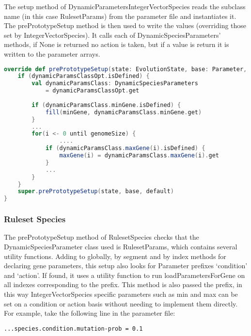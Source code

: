 The setup method of DynamicParametersIntegerVectorSpecies reads the subclass name (in this case RulesetParams) from the parameter file and instantiates it. The prePrototypeSetup method is then used to write the values (overriding those set by IntegerVectorSpecies). It calls each of DynamicSpeciesParameters' methods, if None is returned no action is taken, but if a value is return it is written to the parameter arrays.

\begin{minipage}{0.9\linewidth}
\centering
\begin{lstlisting}[language=scala]
override def prePrototypeSetup(state: EvolutionState, base: Parameter, default: Parameter): Unit = {
    if (dynamicParamsClassOpt.isDefined) {
        val dynamicParamsClass: DynamicSpeciesParameters
            = dynamicParamsClassOpt.get
      
        if (dynamicParamsClass.minGene.isDefined) {
            fill(minGene, dynamicParamsClass.minGene.get)
        }
        ...
        for(i <- 0 until genomeSize) {
    	        ....
            if (dynamicParamsClass.maxGene(i).isDefined) {
                maxGene(i) = dynamicParamsClass.maxGene(i).get
            }
            ...
        }
    }
    super.prePrototypeSetup(state, base, default)
}

\end{lstlisting}
\end{minipage}

\subsubsection*{\hspace{6pt}Ruleset Species}

The prePrototypeSetup method of RulesetSpecies checks that the DynamicSpeciesParameter class used is RulesetParams, which contains several utility functions. Adding to globally, by segment and by index methods for declaring gene parameters, this setup also looks for Parameter prefixes `{\ttfamily condition}' and `{\ttfamily action}'. If found, it uses a utility function to run loadParametersForGene on all indexes corresponding to the prefix. This method is also passed the prefix, in this way IntegerVectorSpecies specific parameters such as min and max can be set on a condition or action basis without needing to implement them directly. For example, take the following line in the parameter file:

\begin{minipage}{0.9\linewidth}
\centering
\begin{lstlisting}
...species.condition.mutation-prob = 0.1
\end{lstlisting}
\end{minipage}

